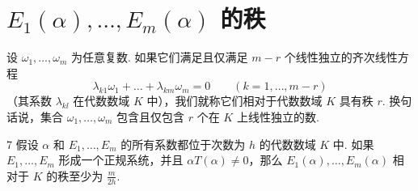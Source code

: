 \section{$E_1(\alpha), \ldots, E_m(\alpha)$ 的秩}

设 $\omega_1, \dots, \omega_m$ 为任意复数. 如果它们满足且仅满足 $m-r$ 个线性独立的齐次线性方程
\[\lambda_{k1} \omega_1 + \dots + \lambda_{km} \omega_m = 0 \qquad (k=1,\dots,m-r)\]
（其系数 $\lambda_{kl}$ 在代数数域 $K$ 中），我们就称它们相对于代数数域 $K$ 具有秩 $r$. 换句话说，集合 $\omega_1, \dots, \omega_m$ 包含且仅包含 $r$ 个在 $K$ 上线性独立的数.

\begin{mylemma}{}{7}
假设 $\alpha$ 和 $E_1, \dots, E_m$ 的所有系数都位于次数为 $h$ 的代数数域 $K$ 中. 如果 $E_1, \dots, E_m$ 形成一个正规系统，并且 $\alpha T(\alpha) \neq 0$，那么 $E_1(\alpha), \dots, E_m(\alpha)$ 相对于 $K$ 的秩至少为 $\frac{m}{2h}$.
\end{mylemma}

